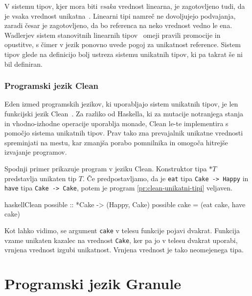V sistemu tipov, kjer mora biti \textit{vsaka} vrednost linearna, je zagotovljeno tudi, da je vsaka vrednost unikatna~\cite{marshall2022linearity}. Linearni tipi namreč ne dovoljujejo podvajanja, zaradi česar je zagotovljeno, da bo referenca na neko vrednost vedno le ena. Wadlerjev sistem stanovitnih linearnih tipov~\cite{wadler1990linear} omeji pravili promocije in opustitve, s čimer v jezik ponovno uvede pogoj za unikatnost reference. Sistem tipov glede na definicijo bolj ustreza sistemu unikatnih tipov, ki pa takrat še ni bil definiran.

\subsubsection{Programski jezik Clean}

Eden izmed programskih jezikov, ki uporabljajo sistem unikatnih tipov, je len funkcijski jezik Clean~\cite{smetsers1994guaranteeing}. Za razliko od Haskella, ki za mutacije notranjega stanja in vhodno-izhodne operacije uporablja monade, Clean le-te implementira s pomočjo sistema unikatnih tipov. Prav tako zna prevajalnik unikatne vrednosti spreminjati na mestu, kar zmanjša porabo pomnilnika in omogoča hitrejše izvajanje programov.

Spodnji primer prikazuje program v jeziku Clean. Konstruktor tipa $*T$ predstavlja unikaten tip $T$. Če predpostavljamo, da je \texttt{eat} tipa \texttt{Cake -> Happy} in \texttt{have} tipa \texttt{Cake -> Cake}, potem je program \ref{pr:clean-unikatni-tipi} veljaven. 

\begin{primer}[ht]
\centering
\begin{code-box}{haskell}{Clean \cmark}
possible :: *Cake -> (Happy, Cake)
possible cake = (eat cake, have cake)
\end{code-box}
\caption{Veljaven program v jeziku Clean z unikatnimi tipi}
\label{pr:clean-unikatni-tipi}
\end{primer}

Kot lahko vidimo, se argument \texttt{cake} v telesu funkcije pojavi dvakrat. Funkcija vzame unikaten kazalec na vrednost \texttt{Cake}, ker pa jo v telesu dvakrat uporabi, vrnjena vrednost izgubi unikatnost. Vrnjena vrednost je tako neomejenega tipa.

\section{Programski jezik Granule}
\label{sec:granule}

